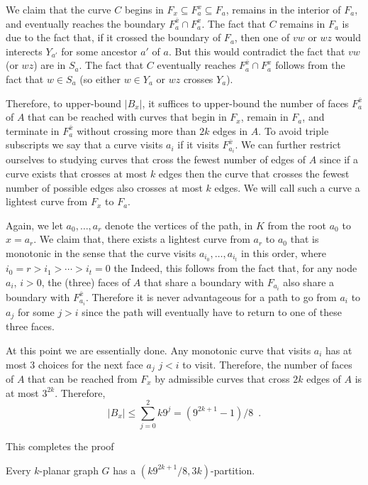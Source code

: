 \documentclass{patmorin}
\begin{document}
We claim that the curve $C$ begins in $F_x\subseteq F^x_a\subseteq F_a$, remains in the interior of $F_a$, and eventually reaches the boundary $F^{\bar{x}}_a\cap F^x_a$.  The fact that $C$ remains in $F_a$ is due to the fact that, if it crossed the boundary of $F_a$, then one of $vw$ or $wz$ would interects $Y_{a'}$ for some ancestor $a'$ of $a$.  But this would contradict the fact that $vw$ (or $wz$) are in $S_a$. The fact that $C$ eventually reaches $F^{\bar{x}}_a\cap F^x_a$ follows from the fact that $w\in S_a$ (so either $w\in Y_a$ or $wz$ crosses $Y_a$).

Therefore, to upper-bound $|B_x|$, it suffices to upper-bound the number of faces $F^{\bar{x}}_a$ of $A$ that can be reached with curves that begin in $F_x$, remain in $F_a$, and terminate in $F^{\bar{x}}_a$ without crossing more than $2k$ edges in $A$.  To avoid triple subscripts we say that a curve visits $a_i$ if it visits $F^{\bar{x}}_{a_i}$.  We can further restrict ourselves to studying curves that cross the fewest number of edges of $A$ since if a curve exists that crosses at most $k$ edges then the curve that crosses the fewest number of possible edges also crosses at most $k$ edges.  We will call such a curve a lightest curve from $F_x$ to $F_a$.

Again, we let $a_0,\ldots,a_r$ denote the vertices of the path, in $K$ from the root $a_0$ to $x=a_r$.  We claim that, there exists a lightest curve from $a_r$ to $a_0$ that is monotonic in the sense that the curve visits $a_{i_0},\ldots,a_{i_t}$ in this order, where $i_0=r > i_1>\cdots>i_t=0$ the Indeed, this follows from the fact that, for any node $a_i$, $i>0$, the (three) faces of $A$ that share a boundary with $F_{a_i}$ also share a boundary with $F^{\bar{x}}_{a_i}$.  Therefore it is never advantageous for a path to go from $a_i$ to $a_j$ for some $j>i$ since the path will eventually have to return to one of these three faces.

At this point we are essentially done.  Any monotonic curve that visits $a_i$ has at most 3 choices for the next face $a_j$ $j<i$ to visit.  Therefore, the number of faces of $A$ that can be reached from $F_x$ by admissible curves that cross $2k$ edges of $A$ is at most $3^{2k}$. Therefore,
\[
   |B_x| \le \sum_{j=0}^2k 9^j = (9^{2k+1}-1)/8 \enspace .
\]

This completes the proof

\begin{thm}
    Every $k$-planar graph $G$ has a $(k9^{2k+1}/8,3k)$-partition.
\end{thm}








\end{document}
